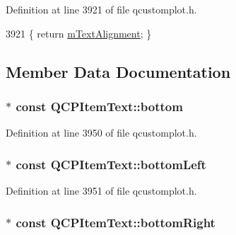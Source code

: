 Definition at line 3921 of file qcustomplot.\+h.


\begin{DoxyCode}
3921 \{ \textcolor{keywordflow}{return} \hyperlink{class_q_c_p_item_text_acdb2e50c38e83da00f083771efbd213f}{mTextAlignment}; \}
\end{DoxyCode}


\subsection{Member Data Documentation}
\hypertarget{class_q_c_p_item_text_a94aeec080f877d3d1d0c3d8ffc10e9e6}{}
\subsubsection[{bottom}]{$\ast$ const Q\+C\+P\+Item\+Text\+::bottom}\label{class_q_c_p_item_text_a94aeec080f877d3d1d0c3d8ffc10e9e6}


Definition at line 3950 of file qcustomplot.\+h.

\hypertarget{class_q_c_p_item_text_a6a1c872ad3789ecafcaeac2066e218a0}{}
\subsubsection[{bottom\+Left}]{$\ast$ const Q\+C\+P\+Item\+Text\+::bottom\+Left}\label{class_q_c_p_item_text_a6a1c872ad3789ecafcaeac2066e218a0}


Definition at line 3951 of file qcustomplot.\+h.

\hypertarget{class_q_c_p_item_text_a8ad47045c29af43b0312f7d93bb74374}{}
\subsubsection[{bottom\+Right}]{$\ast$ const Q\+C\+P\+Item\+Text\+::bottom\+Right}\label{class_q_c_p_item_text_a8ad47045c29af43b0312f7d93bb74374}



